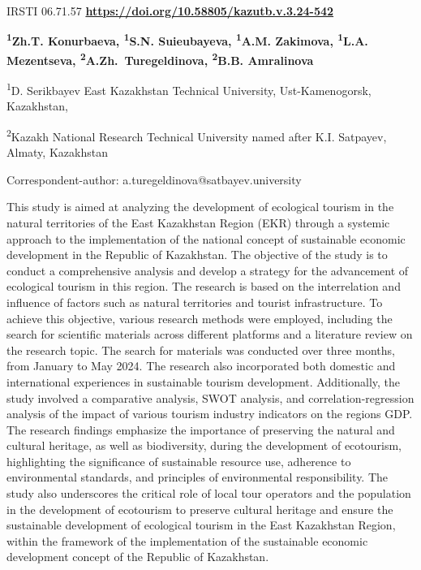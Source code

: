 \newpage
IRSTI 06.71.57
\hfill {\bfseries \href{https://doi.org/10.58805/kazutb.v.3.24-542}{https://doi.org/10.58805/kazutb.v.3.24-542}}


\begin{center}
{\bfseries \textsuperscript{1}Zh.T. Konurbaeva, \textsuperscript{1}S.N.
Suieubayeva, \textsuperscript{1}A.M. Zakimova, \textsuperscript{1}L.A.
Mezentseva, \textsuperscript{2}A.Zh.~Turegeldinova\envelope,
\textsuperscript{2}B.B. Amralinova}

\textsuperscript{1}D. Serikbayev East Kazakhstan Technical University,
Ust-Kamenogorsk, Kazakhstan,

\textsuperscript{2}Kazakh National Research Technical University named
after K.I. Satpayev, Almaty, Kazakhstan
\end{center}

\envelope Correspondent-author:
a.turegeldinova@satbayev.university

This study is aimed at analyzing the development of ecological tourism
in the natural territories of the East Kazakhstan Region (EKR) through a
systemic approach to the implementation of the national concept of
sustainable economic development in the Republic of Kazakhstan. The
objective of the study is to conduct a comprehensive analysis and
develop a strategy for the advancement of ecological tourism in this
region. The research is based on the interrelation and influence of
factors such as natural territories and tourist infrastructure. To
achieve this objective, various research methods were employed,
including the search for scientific materials across different platforms
and a literature review on the research topic. The search for materials
was conducted over three months, from January to May 2024. The research
also incorporated both domestic and international experiences in
sustainable tourism development. Additionally, the study involved a
comparative analysis, SWOT analysis, and correlation-regression analysis
of the impact of various tourism industry indicators on the
region\textquotesingle s GDP. The research findings emphasize the
importance of preserving the natural and cultural heritage, as well as
biodiversity, during the development of ecotourism, highlighting the
significance of sustainable resource use, adherence to environmental
standards, and principles of environmental responsibility. The study
also underscores the critical role of local tour operators and the
population in the development of ecotourism to preserve cultural
heritage and ensure the sustainable development of ecological tourism in
the East Kazakhstan Region, within the framework of the implementation
of the sustainable economic development concept of the Republic of
Kazakhstan.

